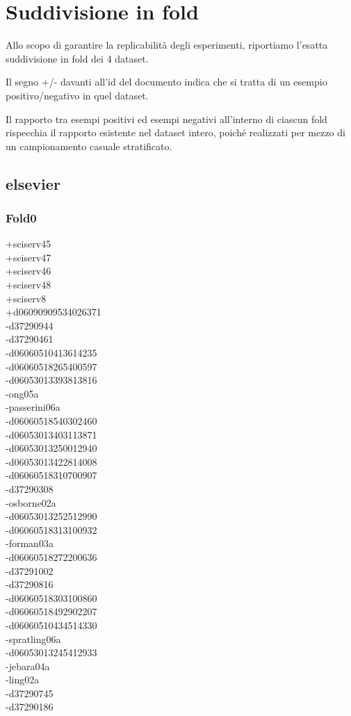 \section{Suddivisione in fold}
\label{appendix:fold}
Allo scopo di garantire la replicabilità degli esperimenti, riportiamo l'esatta suddivisione in fold dei 4 dataset.

Il segno +/- davanti all'id del documento indica che si tratta di un esempio positivo/negativo in quel dataset.

Il rapporto tra esempi positivi ed esempi negativi all'interno di ciascun fold rispecchia il rapporto esistente nel dataset intero, poiché realizzati per mezzo di un campionamento casuale stratificato.

\scriptsize
\begin{multicols}{3}
\subsection{elsevier}
\vspace{.5cm}

\subsubsection*{Fold0}
+sciserv45\\
+sciserv47\\
+sciserv46\\
+sciserv48\\
+sciserv8\\
+d06090909534026371\\
-d37290944\\
-d37290461\\
-d06060510413614235\\
-d06060518265400597\\
-d06053013393813816\\
-ong05a\\
-passerini06a\\
-d06060518540302460\\
-d06053013403113871\\
-d06053013250012940\\
-d06053013422814008\\
-d06060518310700907\\
-d37290308\\
-osborne02a\\
-d06053013252512990\\
-d06060518313100932\\
-forman03a\\
-d06060518272200636\\
-d37291002\\
-d37290816\\
-d06060518303100860\\
-d06060518492902207\\
-d06060510434514330\\
-spratling06a\\
-d06053013245412933\\
-jebara04a\\
-ling02a\\
-d37290745\\
-d37290186\\

\end{multicols}
